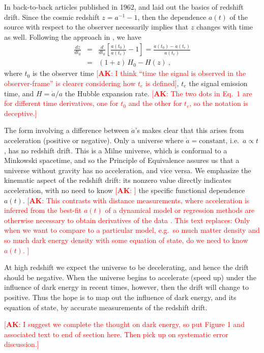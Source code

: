 \documentclass[preprint2, 10pt]{aastex}
\newcommand{\bea}{\begin{eqnarray}}
\newcommand{\eea}{\end{eqnarray}}
\newcommand{\alex}[1]{\textcolor{red}{[{\bf AK}: #1]}}
\begin{document}
In back-to-back articles published in 1962, \citet{mcvittie} and 
\citet{sandage} laid out the basics of redshift drift.  Since the 
cosmic redshift $z=a^{-1}-1$, then the dependence $a(t)$ of the source with 
respect to the observer necessarily implies that $z$ changes with time as 
well. Following the approach in \citet{fpoc}, we have 
\bea 
\frac{dz}{dt_0}&=&\frac{d}{dt_0}\left[\frac{a(t_0)}{a(t_e)}-1\right] 
=\frac{\dot a(t_0)-\dot a (t_e)}{a(t_e)}\\ 
&=&(1+z)\,H_0-H(z)\ , 
\eea 
where $t_0$ is the observer time \alex{I think ``time the signal is observed in the observer-frame'' is clearer considering how
$t_e$ is defined}, $t_e$ the signal emission time, and 
$H=\dot a/a$ the Hubble expansion rate.
\alex{The two dots in Eq.~1 are for different time derivatives, one for $t_0$ and the other for $t_e$, so the notation is deceptive.}

The form involving a difference 
between $\dot a$'s makes clear that this arises from acceleration (positive 
or negative).
Only a universe where $\dot a=\mbox{constant}$, i.e.\ $a\propto t$, 
has no redshift drift.  This is a Milne universe, which is conformal to a 
Minkowski spacetime, and so the Principle of Equivalence assures us that 
a universe without gravity has no acceleration, and vice versa. 
We emphasize the kinematic aspect of the redshift drift: its nonzero 
value directly indicates acceleration, with no need to know \alex{} the specific functional dependence $a(t)$. 
\alex{This contrasts with distance measurements, where
acceleration is inferred from the best-fit $a(t)$ of a dynamical model \citep{1998AJ....116.1009R,1999ApJ...517..565P}
or  regression methods are otherwise necessary to obtain derivatives of the data \citep{2012PhRvD..85l3530S,2012JCAP...06..036S}.
This text replaces: Only when we want to compare 
to a particular model, e.g.\ so much matter density and so much dark energy 
density with some equation of state, do we need to know $a(t)$. }

At high redshift we expect the universe to be decelerating, and hence 
the drift should be negative.  When the universe begins to accelerate 
(speed up) under the influence of dark energy in recent times, however, 
then the drift will change to positive.  Thus the hope is to map out the 
influence of dark energy, and its equation of state, by accurate 
measurements of the redshift drift. 

\alex{I suggest we complete the thought on dark energy, so put Figure 1 and associated text to end of section here.
Then pick up on systematic error discussion.}
\end{document}
